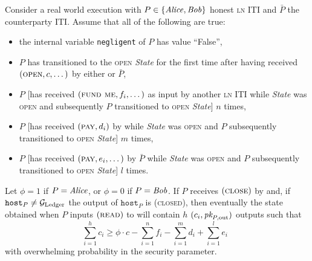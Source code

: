 \begin{lemma}
\label{lemma:real-balance-security}
  Consider a real world execution with $P \in \{\mathit{Alice}, \mathit{Bob}\}$ honest
  \textsc{ln} ITI and $\bar{P}$ the counterparty ITI. Assume that all of the
  following are true:
  \begin{itemize}
    \item the internal variable \texttt{negligent} of $P$ has value ``False'',
    \item $P$ has transitioned to the \textsc{open} \textit{State} for the first
    time after having received $(\textsc{open}, c, \dots)$ by either
    \environment or $\bar{P}$,
    \item $P$ [has received $(\textsc{fund me}, f_i, \dots)$ as input by another
    \textsc{ln} ITI while \textit{State} was \textsc{open} and subsequently $P$
    transitioned to \textsc{open} \textit{State}] $n$ times,
    \item $P$ [has received $(\textsc{pay}, d_i)$ by \environment while
    \textit{State} was \textsc{open} and $P$ subsequently transitioned to
    \textsc{open} \textit{State}] $m$ times,
    \item $P$ [has received $(\textsc{pay}, e_i, \dots)$ by $\bar{P}$ while
    \textit{State} was \textsc{open} and $P$ subsequently transitioned to
    \textsc{open} \textit{State}] $l$ times.
  \end{itemize}
  Let $\phi = 1$ if $P = \mathit{Alice}$, or $\phi = 0$ if $P = \mathit{Bob}$. If $P$ receives
  $(\textsc{close})$ by \environment and, if $\texttt{host}_P \neq \mathcal{G}_{\mathrm{Ledger}}$
  the output of $\texttt{host}_P$ is (\textsc{closed}), then eventually the
  state obtained when $P$ inputs $(\textsc{read})$ to \ledger will contain $h$
  $(c_i, \textit{pk}_{P, \mathrm{out}})$ outputs such that
  \begin{equation}
  \label{lemma:real-balance-security:ineq}
    \sum\limits_{i=1}^h c_i \geq \phi \cdot c - \sum\limits_{i=1}^n f_i -
    \sum\limits_{i=1}^m d_i + \sum\limits_{i=1}^l e_i \enspace
  \end{equation}
  with overwhelming probability in the security parameter.
\end{lemma}

